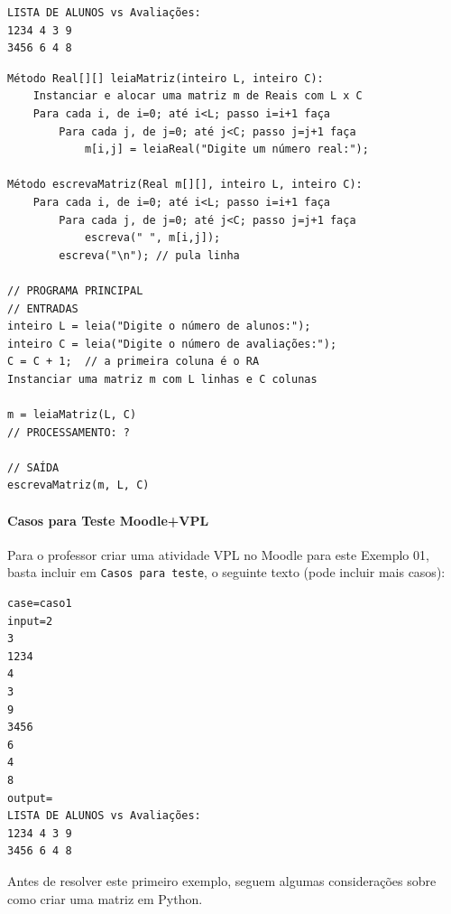 \documentclass[12pt,a4paper]{article}
\begin{document}
\begin{verbatim}
LISTA DE ALUNOS vs Avaliações:
1234 4 3 9
3456 6 4 8
\end{verbatim}

    \begin{verbatim}
Método Real[][] leiaMatriz(inteiro L, inteiro C):
    Instanciar e alocar uma matriz m de Reais com L x C
    Para cada i, de i=0; até i<L; passo i=i+1 faça
        Para cada j, de j=0; até j<C; passo j=j+1 faça
            m[i,j] = leiaReal("Digite um número real:");

Método escrevaMatriz(Real m[][], inteiro L, inteiro C):
    Para cada i, de i=0; até i<L; passo i=i+1 faça
        Para cada j, de j=0; até j<C; passo j=j+1 faça
            escreva(" ", m[i,j]);
        escreva("\n"); // pula linha

// PROGRAMA PRINCIPAL
// ENTRADAS
inteiro L = leia("Digite o número de alunos:");
inteiro C = leia("Digite o número de avaliações:");
C = C + 1;  // a primeira coluna é o RA
Instanciar uma matriz m com L linhas e C colunas

m = leiaMatriz(L, C)
// PROCESSAMENTO: ?

// SAÍDA
escrevaMatriz(m, L, C)
\end{verbatim}

    \hypertarget{casos-para-teste-moodlevpl}{%
\paragraph{Casos para Teste
Moodle+VPL}\label{casos-para-teste-moodlevpl}}

Para o professor criar uma atividade VPL no Moodle para este Exemplo 01,
basta incluir em \texttt{Casos\ para\ teste}, o seguinte texto (pode
incluir mais casos):

\begin{verbatim}
case=caso1
input=2
3
1234
4
3
9
3456
6
4
8
output=
LISTA DE ALUNOS vs Avaliações:
1234 4 3 9
3456 6 4 8
\end{verbatim}

    Antes de resolver este primeiro exemplo, seguem algumas considerações
sobre como criar uma matriz em Python.
\end{document}
